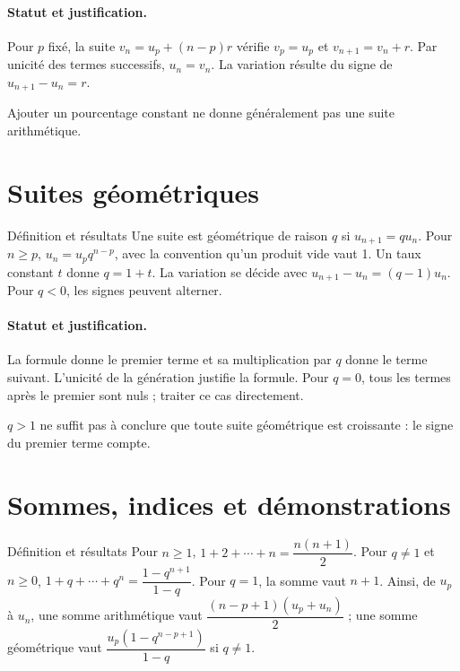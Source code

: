 \paragraph{Statut et justification.} Pour $p$ fixé, la suite $v_n=u_p+(n-p)r$ vérifie $v_p=u_p$ et $v_{n+1}=v_n+r$. Par unicité des termes successifs, $u_n=v_n$. La variation résulte du signe de $u_{n+1}-u_n=r$.
\label{C01-EX2}
\begin{erreur}Ajouter un pourcentage constant ne donne généralement pas une suite arithmétique.\end{erreur}
\label{C01-AP2}
\section{Suites géométriques}\label{C01-U3}
\begin{repere}{Définition et résultats}
Une suite est géométrique de raison $q$ si $u_{n+1}=qu_n$. Pour $n\geq p$, $u_n=u_pq^{n-p}$, avec la convention qu’un produit vide vaut 1. Un taux constant $t$ donne $q=1+t$. La variation se décide avec $u_{n+1}-u_n=(q-1)u_n$. Pour $q<0$, les signes peuvent alterner.
\end{repere}
\paragraph{Statut et justification.} La formule donne le premier terme et sa multiplication par $q$ donne le terme suivant. L’unicité de la génération justifie la formule. Pour $q=0$, tous les termes après le premier sont nuls ; traiter ce cas directement.
\label{C01-EX3}
\begin{erreur}$q>1$ ne suffit pas à conclure que toute suite géométrique est croissante : le signe du premier terme compte.\end{erreur}
\label{C01-AP3}
\section{Sommes, indices et démonstrations}\label{C01-U4}
\begin{repere}{Définition et résultats}
Pour $n\geq1$, $1+2+\cdots +n=\dfrac{n(n+1)}{2}$. Pour $q\ne1$ et $n\geq0$, $1+q+\cdots +q^n=\dfrac{1-q^{n+1}}{1-q}$. Pour $q=1$, la somme vaut $n+1$. Ainsi, de $u_p$ à $u_n$, une somme arithmétique vaut $\dfrac{(n-p+1)(u_p+u_n)}{2}$ ; une somme géométrique vaut $\dfrac{u_p(1-q^{n-p+1})}{1-q}$ si $q\ne1$.
\end{repere}
